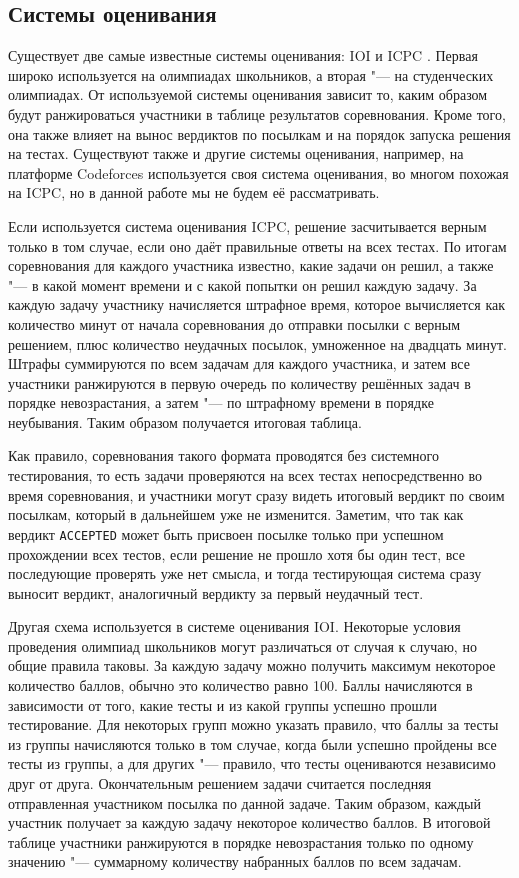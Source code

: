 \subsection*{Системы оценивания}

Существует две самые известные системы оценивания: IOI и ICPC \cite{wiki}. Первая широко используется на олимпиадах школьников, а вторая "--- на студенческих олимпиадах. От используемой системы оценивания зависит то, каким образом будут ранжироваться участники в таблице результатов соревнования. Кроме того, она также влияет на вынос вердиктов по посылкам и на порядок запуска решения на тестах. Существуют также и другие системы оценивания, например, на платформе Codeforces \cite{codeforces} используется своя система оценивания, во многом похожая на ICPC, но в данной работе мы не будем её рассматривать.

Если используется система оценивания ICPC, решение засчитывается верным только в том случае, если оно даёт правильные ответы на всех тестах. По итогам соревнования для каждого участника известно, какие задачи он решил, а также "--- в какой момент времени и с какой попытки он решил каждую задачу. За каждую задачу участнику начисляется штрафное время, которое вычисляется как количество минут от начала соревнования до отправки посылки с верным решением, плюс количество неудачных посылок, умноженное на двадцать минут. Штрафы суммируются по всем задачам для каждого участника, и затем все участники ранжируются в первую очередь по количеству решённых задач в порядке невозрастания, а затем "--- по штрафному времени в порядке неубывания. Таким образом получается итоговая таблица.

Как правило, соревнования такого формата проводятся без системного тестирования, то есть задачи проверяются на всех тестах непосредственно во время соревнования, и участники могут сразу видеть итоговый вердикт по своим посылкам, который в дальнейшем уже не изменится. Заметим, что так как вердикт \texttt{ACCEPTED} может быть присвоен посылке только при успешном прохождении всех тестов, если решение не прошло хотя бы один тест, все последующие проверять уже нет смысла, и тогда тестирующая система сразу выносит вердикт, аналогичный вердикту за первый неудачный тест.

Другая схема используется в системе оценивания IOI. Некоторые условия проведения олимпиад школьников могут различаться от случая к случаю, но общие правила таковы. За каждую задачу можно получить максимум некоторое количество баллов, обычно это количество равно 100. Баллы начисляются в зависимости от того, какие тесты и из какой группы успешно прошли тестирование. Для некоторых групп можно указать правило, что баллы за тесты из группы начисляются только в том случае, когда были успешно пройдены все тесты из группы, а для других "--- правило, что тесты оцениваются независимо друг от друга. Окончательным решением задачи считается последняя отправленная участником посылка по данной задаче. Таким образом, каждый участник получает за каждую задачу некоторое количество баллов. В итоговой таблице участники ранжируются в порядке невозрастания только по одному значению "--- суммарному количеству набранных баллов по всем задачам.

